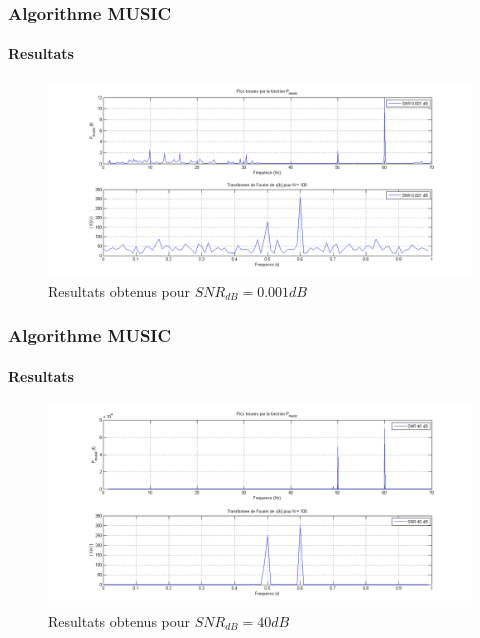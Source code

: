 \documentclass[10pt]{beamer}
\begin{document}
    
    \begin{frame}
        \frametitle{Algorithme MUSIC}
        \framesubtitle{Resultats}
        
        \begin{figure}[h]
            \centering
            \includegraphics[scale= 0.28]{images/snr0001}
            \caption{Resultats obtenus pour \(SNR_{dB} = 0.001 dB\)}
            \label{fig:wave0001}
        \end{figure}
        
    \end{frame}
    
    
    \begin{frame}
        \frametitle{Algorithme MUSIC}
        \framesubtitle{Resultats}
        
        \begin{figure}[h]
            \centering
            \includegraphics[scale=0.28 ]{images/snr40}
            \caption{Resultats obtenus pour \(SNR_{dB} = 40 dB\)}
            \label{fig:snr40}
        \end{figure}
    \end{frame}
    
\end{document}
